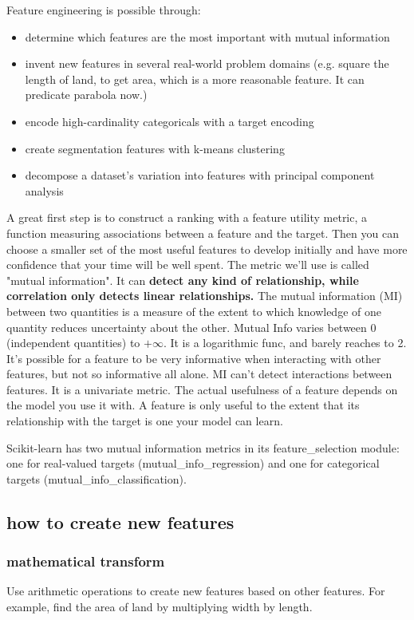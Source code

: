 \documentclass[12pt]{report}
\begin{document}
Feature engineering is possible through:
\begin{itemize}
  \item determine which features are the most important with mutual information
  \item invent new features in several real-world problem domains (e.g. square the length of land, to get area, which is a more reasonable feature. It can predicate parabola now.)
  \item encode high-cardinality categoricals with a target encoding
  \item create segmentation features with k-means clustering
  \item decompose a dataset's variation into features with principal component analysis
\end{itemize}

A great first step is to construct a ranking with a feature utility metric, a function measuring associations between a feature and the target. Then you can choose a smaller set of the most useful features to develop initially and have more confidence that your time will be well spent. The metric we'll use is called "mutual information". It can \textbf{detect any kind of relationship, while correlation only detects linear relationships.} The mutual information (MI) between two quantities is a measure of the extent to which knowledge of one quantity reduces uncertainty about the other. Mutual Info varies between 0 (independent quantities) to $+ \infty $. It is a logarithmic func, and barely reaches to 2. It's possible for a feature to be very informative when interacting with other features, but not so informative all alone. MI can't detect interactions between features. It is a univariate metric.
The actual usefulness of a feature depends on the model you use it with. A feature is only useful to the extent that its relationship with the target is one your model can learn.

Scikit-learn has two mutual information metrics in its feature\_selection module: one for real-valued targets (mutual\_info\_regression) and one for categorical targets (mutual\_info\_classification).

\subsection{how to create new features}

\subsubsection{mathematical transform}
Use arithmetic operations to create new features based on other features. For example, find the area of land by multiplying width by length.
\end{document}
